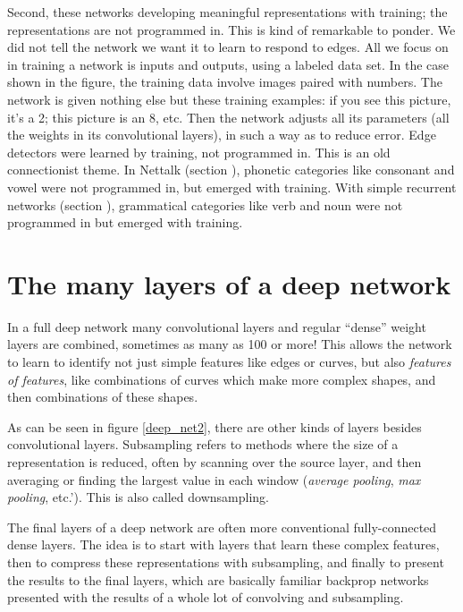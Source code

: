 Second, these networks developing meaningful representations with training; the representations are not programmed in. This is kind of remarkable to ponder. We did not tell the network we want it to learn to respond to edges. All we focus on in training a network is inputs and outputs, using a labeled data set.  In the case shown in the figure, the training data involve images paired with numbers. The network is given nothing else but these training examples: if you see this picture, it's a 2; this picture is an 8, etc. Then the network adjusts all its parameters (all the weights in its convolutional layers), in such a way as to reduce error.  Edge detectors were learned by training, not programmed in. This is an old connectionist theme. In Nettalk (section ), phonetic categories like consonant and vowel were not programmed in, but emerged with training. With simple recurrent networks  (section ), grammatical categories like verb and noun were not programmed in but  emerged with training.

\section{The many layers of a deep network}

In a full deep network many convolutional layers and regular ``dense'' weight layers are combined, sometimes as many as 100 or more! This allows the network to learn to identify not just simple features like edges or curves, but also \emph{features of features}, like combinations of curves which make more complex shapes, and then combinations of these shapes. 

As can be seen in figure \ref{deep_net2}, there are other kinds of layers besides convolutional layers. Subsampling refers to methods where the size of a representation is reduced, often by scanning over the source layer, and then averaging or finding the largest value in each window (\emph{average pooling}, \emph{max pooling}, etc.').  This is also called downsampling.  

The final layers of a deep network are often more conventional fully-connected dense layers. The idea is to start with layers that learn these complex features, then to compress these representations with subsampling, and finally to present the results to the final layers, which are basically familiar backprop networks presented with the results of a whole lot of convolving and subsampling.

